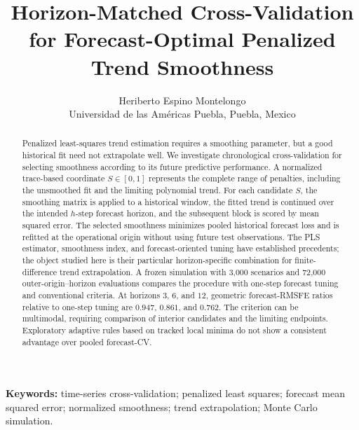 \documentclass[11pt]{article}
\begin{document}
\title{Horizon-Matched Cross-Validation for Forecast-Optimal Penalized Trend Smoothness}

\author{Heriberto Espino Montelongo\\
Universidad de las Am\'ericas Puebla, Puebla, Mexico}
\date{}

\maketitle

\begin{abstract}
Penalized least-squares trend estimation requires a smoothing
parameter, but a good historical fit need not extrapolate well.
We investigate chronological cross-validation for selecting
smoothness according to its future predictive performance.
A normalized trace-based coordinate $S\in[0,1]$ represents
the complete range of penalties, including the unsmoothed fit
and the limiting polynomial trend. For each candidate $S$,
the smoothing matrix is applied to a historical window,
the fitted trend is continued over the intended $h$-step
forecast horizon, and the subsequent block is scored by
mean squared error. The selected smoothness minimizes pooled
historical forecast loss and is refitted at the operational
origin without using future test observations. The PLS
estimator, smoothness index, and forecast-oriented tuning
have established precedents; the object studied here is
their particular horizon-specific combination for
finite-difference trend extrapolation. A frozen simulation
with 3,000 scenarios and 72,000 outer-origin--horizon
evaluations compares the procedure with one-step forecast
tuning and conventional criteria. At horizons $3$, $6$,
and $12$, geometric forecast-RMSFE ratios relative to
one-step tuning are $0.947$, $0.861$, and $0.762$.
The criterion can be multimodal, requiring comparison
of interior candidates and the limiting endpoints.
Exploratory adaptive rules based on tracked local minima
do not show a consistent advantage over pooled forecast-CV.
\end{abstract}

\noindent\textbf{Keywords:} time-series cross-validation; penalized least squares; forecast mean squared error; normalized smoothness; trend extrapolation; Monte Carlo simulation.

\medskip










\end{document}
